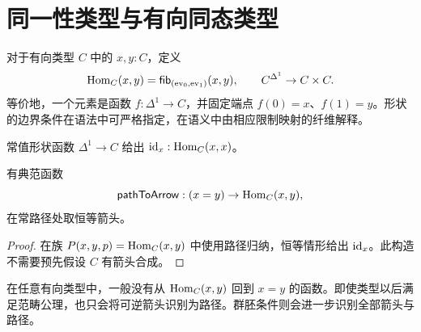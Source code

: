 \section{同一性类型与有向同态类型}
\begin{definition}[有向同态类型]
对于有向类型 $C$ 中的 $x,y:C$，定义
\[
\operatorname{Hom}_C(x,y)=
\mathsf{fib}_{(\operatorname{ev}_0,\operatorname{ev}_1)}(x,y),
\qquad
C^{\Delta^1}\to C\times C.
\]
等价地，一个元素是函数 $f:\Delta^1\to C$，并固定端点 $f(0)=x$、$f(1)=y$。形状的边界条件在语法中可严格指定，在语义中由相应限制映射的纤维解释。
\end{definition}
\begin{definition}[恒等箭头]
常值形状函数 $\Delta^1\to C$ 给出 $\operatorname{id}_x:\operatorname{Hom}_C(x,x)$。
\end{definition}
\begin{proposition}[路径给出箭头]
有典范函数
\[
\mathsf{pathToArrow}:(x=y)\to\operatorname{Hom}_C(x,y),
\]
在常路径处取恒等箭头。
\end{proposition}
\begin{proof}
在族 $P(x,y,p)=\operatorname{Hom}_C(x,y)$ 中使用路径归纳，恒等情形给出 $\operatorname{id}_x$。此构造不需要预先假设 $C$ 有箭头合成。
\end{proof}
\begin{remark}
在任意有向类型中，一般没有从 $\operatorname{Hom}_C(x,y)$ 回到 $x=y$ 的函数。即使类型以后满足范畴公理，也只会将可逆箭头识别为路径。群胚条件则会进一步识别全部箭头与路径。
\end{remark}

